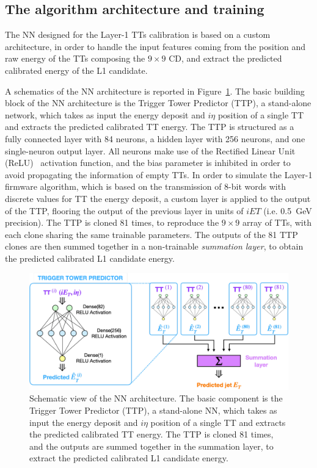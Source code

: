 \subsection{The algorithm architecture and training} 

The NN designed for the Layer-1 TTs calibration is based on a custom architecture, in order to handle the input features coming from the position and raw energy of the TTs composing the $9\times9$ CD, and extract the predicted calibrated energy of the L1 candidate.

A schematics of the NN architecture is reported in Figure~\ref{fig:TTP}.
The basic building block of the NN architecture is the Trigger Tower Predictor (TTP), a stand-alone network, which takes as input the energy deposit and $i\eta$ position of a single TT and extracts the predicted calibrated TT energy.
The TTP is structured as a fully connected layer with 84 neurons, a hidden layer with 256 neurons, and one single-neuron output layer. All neurons make use of the Rectified Linear Unit (ReLU)~\cite{4082265} activation function, and the bias parameter is inhibited in order to avoid propagating the information of empty TTs.
In order to simulate the Layer-1 firmware algorithm, which is based on the transmission of 8-bit words with discrete values for TT the energy deposit, a custom layer is applied to the output of the TTP, flooring the output of the previous layer in units of $iET$ (i.e. 0.5~GeV precision).
The TTP is cloned 81 times, to reproduce the $9\times9$ array of TTs, with each clone sharing the same trainable parameters.
The outputs of the 81 TTP clones are then summed together in a non-trainable \textit{summation layer}, to obtain the predicted calibrated L1 candidate energy.

\bigbreak

\begin{figure}
    \centering
    \includegraphics[width=0.8\linewidth]{Figures/L1TP/TTP.pdf}
    \caption{Schematic view of the NN architecture. The basic component is the Trigger Tower Predictor (TTP), a stand-alone NN, which takes as input the energy deposit and $i\eta$ position of a single TT and extracts the predicted calibrated TT energy. The TTP is cloned 81 times, and the outputs are summed together in the summation layer, to extract the predicted calibrated L1 candidate energy.}
    \label{fig:TTP}
\end{figure}

